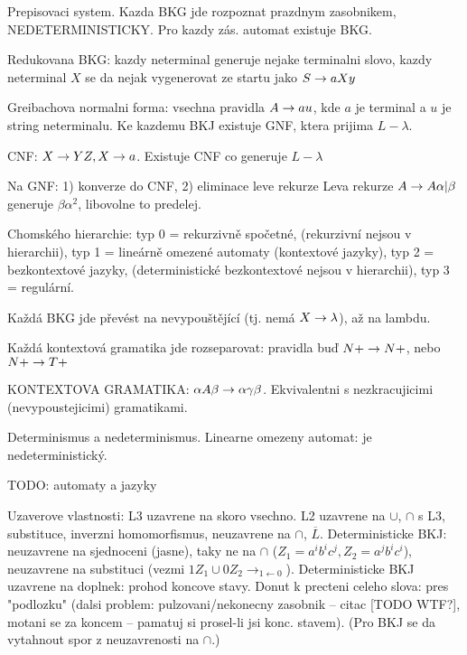 Prepisovaci system.
Kazda BKG jde rozpoznat prazdnym zasobnikem, NEDETERMINISTICKY.
Pro kazdy zás. automat existuje BKG.

Redukovana BKG: kazdy neterminal generuje nejake terminalni slovo,
kazdy neterminal $X$ se da nejak vygenerovat ze startu jako $S\rightarrow aXy$

Greibachova normalni forma: vsechna pravidla $A\rightarrow au$, kde $a$ je terminal
a $u$ je string neterminalu. Ke kazdemu BKJ existuje GNF, ktera prijima
$L-\lambda$.

CNF: $X\rightarrow YZ, X\rightarrow a$. Existuje CNF co generuje $L-\lambda$

Na GNF: 1) konverze do CNF, 2) eliminace leve rekurze
Leva rekurze $A\rightarrow A\alpha|\beta$ generuje $\beta\alpha^2$, libovolne to
predelej.

Chomského hierarchie: typ 0 = rekurzivně spočetné, (rekurzivní nejsou v
hierarchii), typ 1 = lineárně omezené automaty (kontextové jazyky), typ 2 =
bezkontextové jazyky, (deterministické bezkontextové nejsou v hierarchii),
typ 3 = regulární.

Každá BKG jde převést na nevypouštějící (tj. nemá $X\rightarrow\lambda$), až na lambdu.

Každá kontextová gramatika jde rozseparovat: pravidla buď $N+\rightarrow N+$, nebo
$N+\rightarrow T+$

KONTEXTOVA GRAMATIKA: $\alpha A\beta\rightarrow\alpha\gamma\beta$. Ekvivalentni
s nezkracujicimi (nevypoustejicimi) gramatikami.

Determinismus a nedeterminismus.
Linearne omezeny automat: je nedeterministický.

TODO: automaty a jazyky

Uzaverove vlastnosti:
L3 uzavrene na skoro vsechno.
L2 uzavrene na $\cup$, $\cap$ s L3, substituce, inverzni homomorfismus,
neuzavrene na $\cap$, $\overline{L}$.
Deterministicke BKJ: neuzavrene na sjednoceni (jasne), taky ne na $\cap$ ($Z_1=a^i
b^i c^j, Z_2=a^j b^i c^i$), neuzavrene na substituci (vezmi $1Z_1\cup
0Z_2\longrightarrow_{1\leftarrow 0}$).
Deterministicke BKJ uzavrene na doplnek: prohod koncove stavy. Donut k precteni
celeho slova: pres "podlozku" (dalsi problem: pulzovani/nekonecny zasobnik --
citac [TODO WTF?], motani se za koncem -- pamatuj si prosel-li jsi konc. stavem).
(Pro BKJ se da vytahnout spor z neuzavrenosti na $\cap$.)
